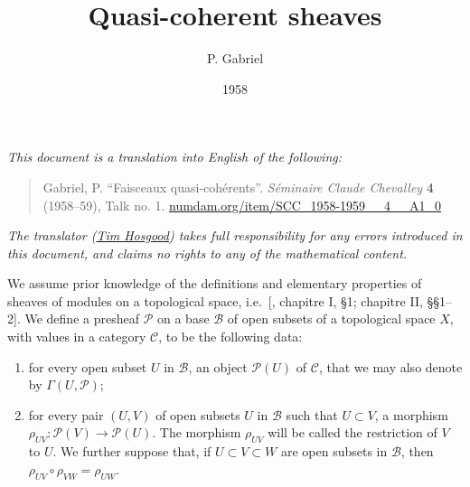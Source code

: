 \documentclass[british]{article}
\title{Quasi-coherent sheaves}
\author{P. Gabriel}
\date{1958}
\providecommand{\tightlist}{%
\setlength{\itemsep}{0pt}\setlength{\parskip}{0pt}}
\newcommand{\oldpage}[1]{\marginpar{\footnotesize$\Big\vert$ \textit{p.~#1}}}
\begin{document}
\maketitle
\thispagestyle{fancy}

\setcounter{footnote}{0}



\emph{This document is a translation into English of the following:}

\begin{quote}
Gabriel, P. ``Faisceaux quasi-cohérents''. \emph{Séminaire Claude
Chevalley} \textbf{4} (1958--59), Talk no. 1.
\href{http://www.numdam.org/item/SCC_1958-1959__4__A1_0}{numdam.org/item/SCC\_1958-1959\_\_4\_\_A1\_0}
\end{quote}

\emph{The translator (\href{https://thosgood.net}{Tim Hosgood}) takes
full responsibility for any errors introduced in this document, and
claims no rights to any of the mathematical content.}

\tableofcontents

\providecommand{\scr}[1]{{\mathscr{#1}}}
\renewcommand{\cal}[1]{{\mathcal{#1}}}
\renewcommand{\frak}[1]{{\mathfrak{#1}}}
\renewcommand{\geq}{\geqslant}
\renewcommand{\leq}{\leqslant}

\providecommand{\HH}{\operatorname{H}}
\providecommand{\Hom}{\operatorname{Hom}}
\providecommand{\Ker}{\operatorname{Ker}}
\providecommand{\Coker}{\operatorname{Coker}}

\oldpage{1-01}

We assume prior knowledge of the definitions and elementary properties
of sheaves of modules on a topological space, i.e.~{[}\textcite{2},
chapitre I, §1; chapitre II, §§1--2{]}. We define a presheaf
\({\mathscr{P}}\) on a base \(\mathscr{B}\) of open subsets of a
topological space \(X\), with values in a category \({\mathcal{C}}\), to
be the following data:

\begin{enumerate}
\def\labelenumi{\alph{enumi}.}
\tightlist
\item
  for every open subset \(U\) in \(\mathscr{B}\), an object
  \({\mathscr{P}}(U)\) of \({\mathcal{C}}\), that we may also denote by
  \(\Gamma(U,{\mathscr{P}})\);
\item
  for every pair \((U,V)\) of open subsets \(U\) in \(\mathscr{B}\) such
  that \(U\subset V\), a morphism
  \(\rho_{UV}\colon{\mathscr{P}}(V)\to{\mathscr{P}}(U)\). The morphism
  \(\rho_{UV}\) will be called the restriction of \(V\) to \(U\). We
  further suppose that, if \(U\subset V\subset W\) are open subsets in
  \(\mathscr{B}\), then \(\rho_{UV}\circ\rho_{VW}=\rho_{UW}\).
\end{enumerate}
\end{document}
